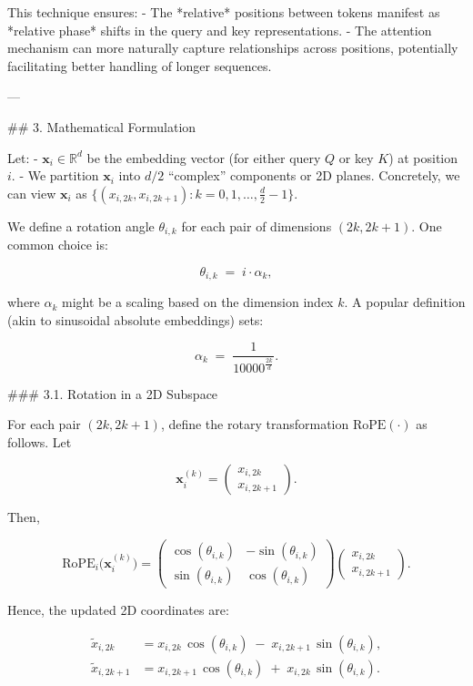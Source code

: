 This technique ensures:
- The *relative* positions between tokens manifest as *relative phase* shifts in the query and key representations.
- The attention mechanism can more naturally capture relationships across positions, potentially facilitating better handling of longer sequences.

---

## 3. Mathematical Formulation

Let:
- \( \mathbf{x}_i \in \mathbb{R}^d \) be the embedding vector (for either query \(Q\) or key \(K\)) at position \(i\).
- We partition \(\mathbf{x}_i\) into \(d/2\) “complex” components or 2D planes.  
  Concretely, we can view \(\mathbf{x}_i\) as \(\{ (x_{i,2k}, x_{i,2k+1}) : k = 0, 1, \ldots, \frac{d}{2}-1 \}\).

We define a rotation angle \(\theta_{i, k}\) for each pair of dimensions \((2k, 2k+1)\). One common choice is:

\[
\theta_{i, k} \;=\; i \cdot \alpha_k,
\]

where \(\alpha_k\) might be a scaling based on the dimension index \(k\). A popular definition (akin to sinusoidal absolute embeddings) sets:

\[
\alpha_k \;=\; \frac{1}{10000^{\frac{2k}{d}}}.
\]

### 3.1. Rotation in a 2D Subspace

For each pair \((2k, 2k+1)\), define the rotary transformation \(\text{RoPE}(\cdot)\) as follows. Let

\[
\mathbf{x}_i^{(k)} 
= \begin{pmatrix}
x_{i, 2k} \\[6pt]
x_{i, 2k+1}
\end{pmatrix}.
\]

Then,

\[
\text{RoPE}_i \bigl(\mathbf{x}_i^{(k)}\bigr)
= \begin{pmatrix}
\cos(\theta_{i, k}) & -\sin(\theta_{i, k}) \\
\sin(\theta_{i, k}) & \cos(\theta_{i, k})
\end{pmatrix}
\begin{pmatrix}
x_{i, 2k} \\[4pt]
x_{i, 2k+1}
\end{pmatrix}.
\]

Hence, the updated 2D coordinates are:

\[
\begin{aligned}
\tilde{x}_{i, 2k} &= x_{i, 2k}\,\cos(\theta_{i,k}) \;-\; x_{i, 2k+1}\,\sin(\theta_{i,k}),\\[6pt]
\tilde{x}_{i, 2k+1} &= x_{i, 2k+1}\,\cos(\theta_{i,k}) \;+\; x_{i, 2k}\,\sin(\theta_{i,k}).
\end{aligned}
\]

